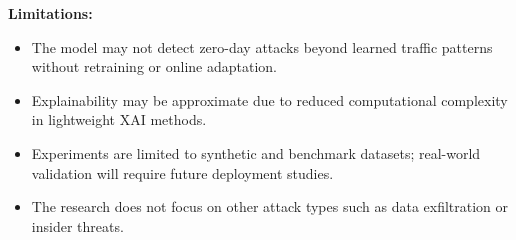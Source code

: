 \documentclass[12pt, a4paper]{report}
\begin{document}
    \textbf{Limitations:}
    \begin{itemize}
    \item The model may not detect zero-day attacks beyond learned traffic patterns without retraining or online adaptation.
    \item Explainability may be approximate due to reduced computational complexity in lightweight XAI methods.
    \item Experiments are limited to synthetic and benchmark datasets; real-world validation will require future deployment studies.
    \item The research does not focus on other attack types such as data exfiltration or insider threats.
\end{itemize}

\end{document}

